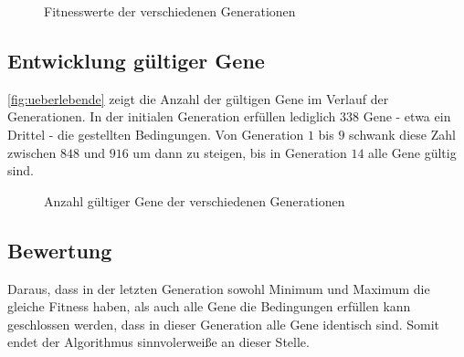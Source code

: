\begin{figure}[ht]
	\caption{Fitnesswerte der verschiedenen Generationen}
	\label{fig:fitness}
\end{figure}


\subsection{Entwicklung gültiger Gene}

\autoref{fig:ueberlebende} zeigt die Anzahl der gültigen Gene im Verlauf der Generationen.
In der initialen Generation erfüllen lediglich $338$ Gene - etwa ein Drittel - die gestellten Bedingungen.
Von Generation $1$ bis $9$ schwank diese Zahl zwischen $848$ und $916$ um dann zu steigen,
 bis in Generation $14$ alle Gene gültig sind.

\begin{figure}[ht]
    \centering
	\caption{Anzahl gültiger Gene der verschiedenen Generationen}
	\label{fig:ueberlebende}
\end{figure}



\subsection{Bewertung}
Daraus, dass in der letzten Generation sowohl Minimum und Maximum die gleiche Fitness haben,
als auch alle Gene die Bedingungen erfüllen kann geschlossen werden, dass in dieser Generation alle Gene identisch sind.
Somit endet der Algorithmus sinnvolerweiße an dieser Stelle.

